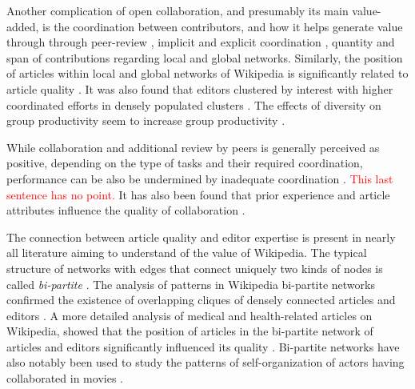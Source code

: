 Another complication of open collaboration, and presumably its main value-added, is the coordination between contributors, and how it helps generate value through through peer-review \cite{hu2007articlequality,wilkinson2007}, implicit and explicit coordination \cite{kittur2008}, quantity and span of contributions regarding local and global networks\cite{arazy2010determinants}. Similarly, the position of articles within local and global networks of Wikipedia is significantly related to article quality \cite{kane2009}. It was also found that editors clustered by interest with higher coordinated efforts in densely populated clusters \cite{jesus2009}.  The effects of diversity on group productivity seem to increase group productivity \cite{chen2010}.

While collaboration and additional review by peers is generally perceived as positive, depending on the type of tasks and their required coordination, performance can be also be undermined by inadequate coordination \cite{kittur2009coordination}. \textcolor{red}{This last sentence has no point.} It has also been found that prior experience and article attributes influence the quality of collaboration \cite{keegan2012}. 



The connection between article quality and editor expertise is present in nearly all literature aiming to understand of the value of Wikipedia. The typical structure of networks with edges that connect uniquely two kinds of nodes is called {\it bi-partite} \cite{newman2001}. The analysis of patterns in Wikipedia bi-partite networks confirmed the existence of overlapping cliques of densely connected articles and editors  \cite{jesus2009}. A more detailed analysis of medical and health-related articles on Wikipedia, showed that the position of articles in the bi-partite network of articles and editors significantly influenced its quality \cite{kane2009}. Bi-partite networks have also notably been used to study the patterns of self-organization of actors having collaborated in movies \cite{ramasco2004self}.

